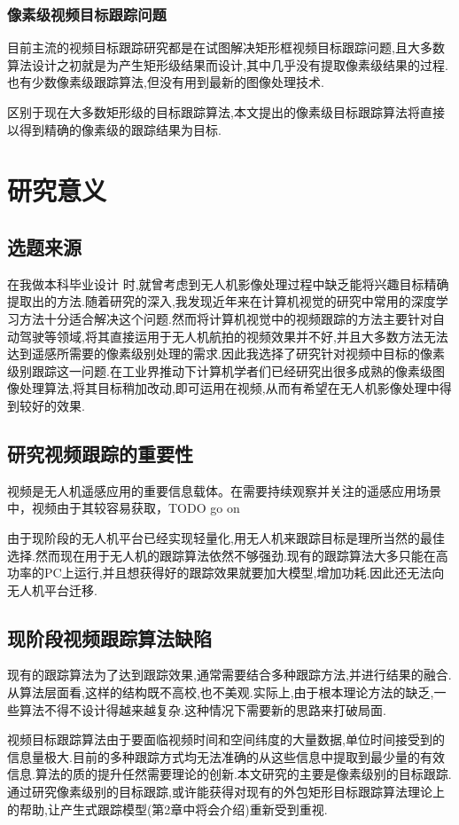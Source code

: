 \subsubsection{像素级视频目标跟踪问题}
目前主流的视频目标跟踪研究都是在试图解决矩形框视频目标跟踪问题,且大多数算法设计之初就是为产生矩形级结果而设计,其中几乎没有提取像素级结果的过程.也有少数像素级跟踪算法,但没有用到最新的图像处理技术.
\par
区别于现在大多数矩形级的目标跟踪算法,本文提出的像素级目标跟踪算法将直接以得到精确的像素级的跟踪结果为目标.

\section{研究意义}
\subsection{选题来源}
在我做本科毕业设计
\supercite{benchme}
时,就曾考虑到无人机影像处理过程中缺乏能将兴趣目标精确提取出的方法.随着研究的深入,我发现近年来在计算机视觉的研究中常用的深度学习方法十分适合解决这个问题.然而将计算机视觉中的视频跟踪的方法主要针对自动驾驶等领域,将其直接运用于无人机航拍的视频效果并不好,并且大多数方法无法达到遥感所需要的像素级别处理的需求.因此我选择了研究针对视频中目标的像素级别跟踪这一问题.在工业界推动下计算机学者们已经研究出很多成熟的像素级图像处理算法,将其目标稍加改动,即可运用在视频,从而有希望在无人机影像处理中得到较好的效果.

\subsection{研究视频跟踪的重要性}
视频是无人机遥感应用的重要信息载体。在需要持续观察并关注的遥感应用场景中，视频由于其较容易获取，TODO go on
\par
由于现阶段的无人机平台已经实现轻量化,用无人机来跟踪目标是理所当然的最佳选择.然而现在用于无人机的跟踪算法依然不够强劲.现有的跟踪算法大多只能在高功率的PC上运行,并且想获得好的跟踪效果就要加大模型,增加功耗.因此还无法向无人机平台迁移.
\par
\subsection{现阶段视频跟踪算法缺陷}
现有的跟踪算法为了达到跟踪效果,通常需要结合多种跟踪方法,并进行结果的融合.从算法层面看,这样的结构既不高校,也不美观.实际上,由于根本理论方法的缺乏,一些算法不得不设计得越来越复杂.这种情况下需要新的思路来打破局面.
\par
视频目标跟踪算法由于要面临视频时间和空间纬度的大量数据,单位时间接受到的信息量极大.目前的多种跟踪方式均无法准确的从这些信息中提取到最少量的有效信息.算法的质的提升任然需要理论的创新.本文研究的主要是像素级别的目标跟踪.通过研究像素级别的目标跟踪,或许能获得对现有的外包矩形目标跟踪算法理论上的帮助,让产生式跟踪模型(第2章中将会介绍)重新受到重视.

